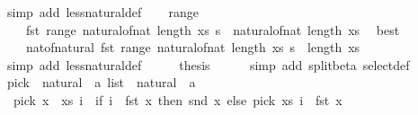 \begin{isabellebody}
\ {\isacharparenleft}{\kern0pt}simp\ add{\isacharcolon}{\kern0pt}\ less{\isacharunderscore}{\kern0pt}natural{\isacharunderscore}{\kern0pt}def{\isacharparenright}{\kern0pt}\isanewline
\ \ \isamarkupfalse%
\ range\ \isamarkupfalse%
\isanewline
\ \ \ \ {\isachardoublequoteopen}fst\ {\isacharparenleft}{\kern0pt}range\ {\isacharparenleft}{\kern0pt}natural{\isacharunderscore}{\kern0pt}of{\isacharunderscore}{\kern0pt}nat\ {\isacharparenleft}{\kern0pt}length\ xs{\isacharparenright}{\kern0pt}{\isacharparenright}{\kern0pt}\ s{\isacharparenright}{\kern0pt}\ {\isacharless}{\kern0pt}\ natural{\isacharunderscore}{\kern0pt}of{\isacharunderscore}{\kern0pt}nat\ {\isacharparenleft}{\kern0pt}length\ xs{\isacharparenright}{\kern0pt}{\isachardoublequoteclose}\ \isamarkupfalse%
\ best\isanewline
\ \ \isamarkupfalse%
\ \isamarkupfalse%
\isanewline
\ \ \ \ {\isachardoublequoteopen}nat{\isacharunderscore}{\kern0pt}of{\isacharunderscore}{\kern0pt}natural\ {\isacharparenleft}{\kern0pt}fst\ {\isacharparenleft}{\kern0pt}range\ {\isacharparenleft}{\kern0pt}natural{\isacharunderscore}{\kern0pt}of{\isacharunderscore}{\kern0pt}nat\ {\isacharparenleft}{\kern0pt}length\ xs{\isacharparenright}{\kern0pt}{\isacharparenright}{\kern0pt}\ s{\isacharparenright}{\kern0pt}{\isacharparenright}{\kern0pt}\ {\isacharless}{\kern0pt}\ length\ xs{\isachardoublequoteclose}\ \isamarkupfalse%
\ {\isacharparenleft}{\kern0pt}simp\ add{\isacharcolon}{\kern0pt}\ less{\isacharunderscore}{\kern0pt}natural{\isacharunderscore}{\kern0pt}def{\isacharparenright}{\kern0pt}\isanewline
\ \ \isamarkupfalse%
\ \isamarkupfalse%
\ {\isacharquery}{\kern0pt}thesis\isanewline
\ \ \ \ \isamarkupfalse%
\ {\isacharparenleft}{\kern0pt}simp\ add{\isacharcolon}{\kern0pt}\ split{\isacharunderscore}{\kern0pt}beta\ select{\isacharunderscore}{\kern0pt}def{\isacharparenright}{\kern0pt}\isanewline
{}\isamarkupfalse%
%
\endisatagproof
{\isafoldproof}%
%
\isadelimproof
\isanewline
%
\endisadelimproof
\isanewline
{}\isamarkupfalse%
\ pick\ {\isacharcolon}{\kern0pt}{\isacharcolon}{\kern0pt}\ {\isachardoublequoteopen}{\isacharparenleft}{\kern0pt}natural\ {\isasymtimes}\ {\isacharprime}{\kern0pt}a{\isacharparenright}{\kern0pt}\ list\ {\isasymRightarrow}\ natural\ {\isasymRightarrow}\ {\isacharprime}{\kern0pt}a{\isachardoublequoteclose}\ \isanewline
\ \ {\isachardoublequoteopen}pick\ {\isacharparenleft}{\kern0pt}x\ {\isacharhash}{\kern0pt}\ xs{\isacharparenright}{\kern0pt}\ i\ {\isacharequal}{\kern0pt}\ {\isacharparenleft}{\kern0pt}if\ i\ {\isacharless}{\kern0pt}\ fst\ x\ then\ snd\ x\ else\ pick\ xs\ {\isacharparenleft}{\kern0pt}i\ {\isacharminus}{\kern0pt}\ fst\ x{\isacharparenright}{\kern0pt}{\isacharparenright}{\kern0pt}{\isachardoublequoteclose}\isanewline

\end{isabellebody}
